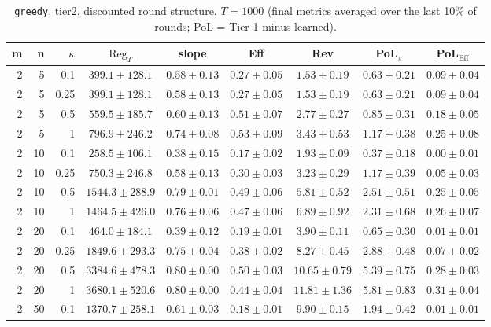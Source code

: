 \begin{table}[htbp]
\centering
\scriptsize
\caption{\texttt{greedy}, tier2, discounted round structure, $T=1000$ (final metrics averaged over the last 10\% of rounds; PoL = Tier-1 minus learned).}
\label{tab:tier2_greedy_discounted}
\begin{tabular}{@{}rrrcccccc@{}}
\toprule
m & n & $\kappa$ & $\mathrm{Reg}_T$ & slope & Eff & Rev & PoL$_\pi$ & PoL$_\mathrm{Eff}$ \\
\midrule
2 & 5 & 0.1 & $399.1 \pm 128.1$ & $0.58 \pm 0.13$ & $0.27 \pm 0.05$ & $1.53 \pm 0.19$ & $0.63 \pm 0.21$ & $0.09 \pm 0.04$ \\
2 & 5 & 0.25 & $399.1 \pm 128.1$ & $0.58 \pm 0.13$ & $0.27 \pm 0.05$ & $1.53 \pm 0.19$ & $0.63 \pm 0.21$ & $0.09 \pm 0.04$ \\
2 & 5 & 0.5 & $559.5 \pm 185.7$ & $0.60 \pm 0.13$ & $0.51 \pm 0.07$ & $2.77 \pm 0.27$ & $0.85 \pm 0.31$ & $0.18 \pm 0.05$ \\
2 & 5 & 1 & $796.9 \pm 246.2$ & $0.74 \pm 0.08$ & $0.53 \pm 0.09$ & $3.43 \pm 0.53$ & $1.17 \pm 0.38$ & $0.25 \pm 0.08$ \\
2 & 10 & 0.1 & $258.5 \pm 106.1$ & $0.38 \pm 0.15$ & $0.17 \pm 0.02$ & $1.93 \pm 0.09$ & $0.37 \pm 0.18$ & $0.00 \pm 0.01$ \\
2 & 10 & 0.25 & $750.3 \pm 246.8$ & $0.58 \pm 0.13$ & $0.30 \pm 0.03$ & $3.23 \pm 0.29$ & $1.17 \pm 0.39$ & $0.05 \pm 0.03$ \\
2 & 10 & 0.5 & $1544.3 \pm 288.9$ & $0.79 \pm 0.01$ & $0.49 \pm 0.06$ & $5.81 \pm 0.52$ & $2.51 \pm 0.51$ & $0.25 \pm 0.05$ \\
2 & 10 & 1 & $1464.5 \pm 426.0$ & $0.76 \pm 0.06$ & $0.47 \pm 0.06$ & $6.89 \pm 0.92$ & $2.31 \pm 0.68$ & $0.26 \pm 0.07$ \\
2 & 20 & 0.1 & $464.0 \pm 184.1$ & $0.39 \pm 0.12$ & $0.19 \pm 0.01$ & $3.90 \pm 0.11$ & $0.65 \pm 0.30$ & $0.01 \pm 0.01$ \\
2 & 20 & 0.25 & $1849.6 \pm 293.3$ & $0.75 \pm 0.04$ & $0.38 \pm 0.02$ & $8.27 \pm 0.45$ & $2.88 \pm 0.48$ & $0.07 \pm 0.02$ \\
2 & 20 & 0.5 & $3384.6 \pm 478.3$ & $0.80 \pm 0.00$ & $0.50 \pm 0.03$ & $10.65 \pm 0.79$ & $5.39 \pm 0.75$ & $0.28 \pm 0.03$ \\
2 & 20 & 1 & $3680.1 \pm 520.6$ & $0.80 \pm 0.00$ & $0.44 \pm 0.04$ & $11.81 \pm 1.36$ & $5.81 \pm 0.83$ & $0.31 \pm 0.04$ \\
2 & 50 & 0.1 & $1370.7 \pm 258.1$ & $0.61 \pm 0.03$ & $0.18 \pm 0.01$ & $9.90 \pm 0.15$ & $1.94 \pm 0.42$ & $0.01 \pm 0.01$ \\

\end{tabular}
\end{table}
